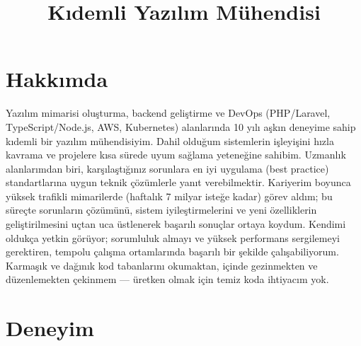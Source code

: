 \documentclass[11pt,a4paper,sans]{moderncv}
\title{K{\i}demli Yaz{\i}l{\i}m M\"uhendisi}
\begin{document}
\makecvtitle

\vspace{-2em}

\section{Hakk{\i}mda}
Yaz{\i}l{\i}m mimarisi olu\c{s}turma, backend geli\c{s}tirme ve DevOps (PHP/Laravel, TypeScript/Node.js, AWS, Kubernetes) alanlar{\i}nda 10 y{\i}l{\i} a\c{s}k{\i}n deneyime sahip k{\i}demli bir yaz{\i}l{\i}m m\"uhendisiyim. Dahil oldu\u{g}um sistemlerin i\c{s}leyi\c{s}ini h{\i}zla kavrama ve projelere k{\i}sa s\"urede uyum sa\u{g}lama yetene\u{g}ine sahibim. Uzmanl{\i}k alanlar{\i}mdan biri, kar\c{s}{\i}la\c{s}t{\i}\u{g}{\i}n{\i}z sorunlara en iyi uygulama (best practice) standartlar{\i}na uygun teknik \c{c}\"oz\"umlerle yan{\i}t verebilmektir. Kariyerim boyunca y\"uksek trafikli mimarilerde (haftal{\i}k 7 milyar iste\u{g}e kadar) g\"orev ald{\i}m; bu s\"ure\c{c}te sorunlar{\i}n \c{c}\"oz\"um\"un\"u, sistem iyile\c{s}tirmelerini ve yeni \"ozelliklerin geli\c{s}tirilmesini u\c{c}tan uca \"ustlenerek ba\c{s}ar{\i}l{\i} sonu\c{c}lar ortaya koydum. Kendimi olduk\c{c}a yetkin g\"or\"uyor; sorumluluk almay{\i} ve y\"uksek performans sergilemeyi gerektiren, tempolu \c{c}al{\i}\c{s}ma ortamlar{\i}nda ba\c{s}ar{\i}l{\i} bir \c{s}ekilde \c{c}al{\i}\c{s}abiliyorum. Karma\c{s}{\i}k ve da\u{g}{\i}n{\i}k kod tabanlar{\i}n{\i} okumaktan, i\c{c}inde gezinmekten ve d\"uzenlemekten \c{c}ekinmem --- \"uretken olmak i\c{c}in temiz koda ihtiyac{\i}m yok.

\section{Deneyim}
\end{document}
